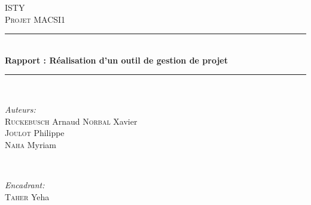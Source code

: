 \documentclass[a4paper, 12pt]{article}
\begin{document}
\begin{titlepage}

\newcommand{\HRule}{\rule{\linewidth}{0.5mm}} %

\center %
 

\textsc{\LARGE ISTY}\\[1.5cm]
\textsc{\Large Projet MACSI1}\\[0.5cm]


\HRule \\[0.4cm]
{ \huge \bfseries Rapport : Réalisation d'un outil de gestion de projet}\\[0.4cm]
\HRule \\[1.5cm]
 

\begin{minipage}{0.4\textwidth}
\begin{flushleft} \large
\emph{Auteurs:}\\
 \textsc{Ruckebusch} Arnaud  
 \textsc{Norbal} Xavier \\
 \textsc{Joulot} Philippe \\
 \textsc{Naha} Myriam

\end{flushleft}
\end{minipage}
~
\begin{minipage}{0.4\textwidth}
\begin{flushright} \large
\emph{Encadrant:} \\
 \textsc{Taher} Yeha

\end{flushright}
\end{minipage}\\[4cm]



\end{titlepage}
\end{document}
